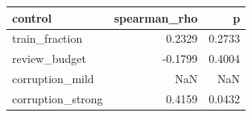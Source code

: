 \begin{tabular}{lrr}
\toprule
          control &  spearman\_rho &      p \\
\midrule
   train\_fraction &        0.2329 & 0.2733 \\
    review\_budget &       -0.1799 & 0.4004 \\
  corruption\_mild &           NaN &    NaN \\
corruption\_strong &        0.4159 & 0.0432 \\
\bottomrule
\end{tabular}
